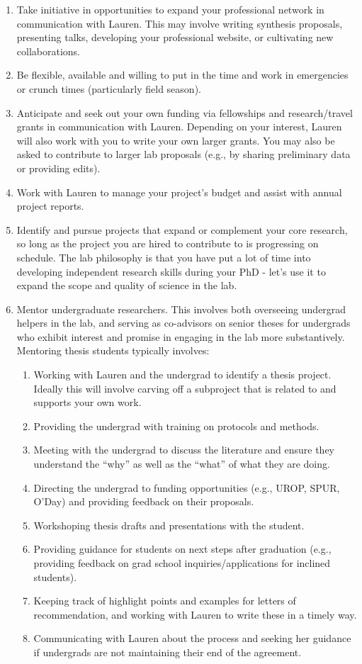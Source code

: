 \documentclass[12pt]{article}
\begin{document}
\begin{enumerate}
\item Take initiative in opportunities to expand your professional network in communication with Lauren. This may involve writing synthesis proposals, presenting talks, developing your professional website, or cultivating new collaborations. 

\item Be flexible, available and willing to put in the time and work in emergencies or crunch times (particularly field season).

\item Anticipate and seek out your own funding via fellowships and research/travel grants in communication with Lauren. Depending on your interest, Lauren will also work with you to write your own larger grants. You may also be asked to contribute to larger lab proposals (e.g., by sharing preliminary data or providing edits).

\item Work with Lauren to manage your project's budget and assist with annual project reports.

\item Identify and pursue projects that expand or complement your core research, so long as the project you are hired to contribute to is progressing on schedule. The lab philosophy is that you have put a lot of time into developing independent research skills during your PhD - let's use it to expand the scope and quality of science in the lab.

\item Mentor undergraduate researchers. This involves both overseeing undergrad helpers in the lab, and serving as co-advisors on senior theses for undergrads who exhibit interest and promise in engaging in the lab more substantively. Mentoring thesis students typically involves:
\begin{enumerate}
\item Working with Lauren and the undergrad to identify a thesis project. Ideally this will involve carving off a subproject that is related to and supports your own work.
\item Providing the undergrad with training on protocols and methods.
\item Meeting with the undergrad to discuss the literature and ensure they understand the ``why'' as well as the ``what'' of what they are doing.
\item Directing the undergrad to funding opportunities (e.g., UROP, SPUR, O'Day) and providing feedback on their proposals.
\item Workshoping thesis drafts and presentations with the student.
\item Providing guidance for students on next steps after graduation (e.g., providing feedback on grad school inquiries/applications for inclined students).
\item Keeping track of highlight points and examples for letters of recommendation, and working with Lauren to write these in a timely way.
\item Communicating with Lauren about the process and seeking her guidance if undergrads are not maintaining their end of the agreement.
\end{enumerate}


\end{enumerate}
\end{document}
